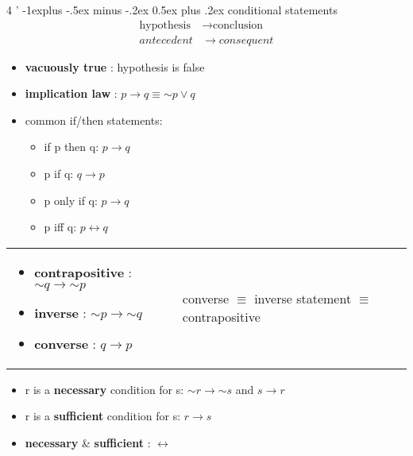 \documentclass[10pt, landscape]{article}
\makeatletter
\renewcommand{\subsection}{\@startsection{subsection}{2}{0mm}%
                                {-1explus -.5ex minus -.2ex}%
                                {0.5ex plus .2ex}%
                                {\normalfont\normalsize\bfseries}}
\renewcommand{\lnot}{\mathord{\sim}}
\renewcommand{\bf}[1]{\textbf{#1}}
\let\iff\leftrightarrow
\let\then\rightarrow
\makeatother
\begin{document}
\begin{multicols}{4
    '}
\subsection{conditional statements}
    \begin{equation*}
        \begin{split}
            \text{hypothesis} &\then \text{conclusion} \\
            antecedent &\then consequent
        \end{split}
    \end{equation*}

\begin{itemize}
    \item \textbf{vacuously true} : hypothesis is false
    \item \textbf{implication law} : $p \then q \equiv \lnot p \lor q$
    \item common if/then statements:
    \begin{itemize}
        \item if p then q: $p \then q$
        \item p if q: $q \then p$
        \item p only if q: $p \then q$
        \item p iff q: $p \iff q$
    \end{itemize}
\end{itemize}

\setlength{\tabcolsep}{0.3em}
\begin{tabular}{>{\color{black}}p{}| >{\color{black}}p{}}
    \begin{itemize}
        \item \bf{contrapositive} : $\lnot q \then \lnot p$ 
        \item \bf{inverse} : $\lnot p \then \lnot q$ 
        \item \bf{converse} : $q \then p$ 
    \end{itemize} 
    & converse $\equiv$ inverse \newline
    statement $\equiv$ contrapositive
\end{tabular}
\begin{itemize}
    \item r is a \bf{necessary} condition for s: $\lnot r \then \lnot s$ and $s \then r$
    \item r is a \bf{sufficient} condition for s: $r \then s$
    \item \bf{necessary} \& \bf{sufficient} : $\iff$
\end{itemize}


\end{multicols}
\end{document}
